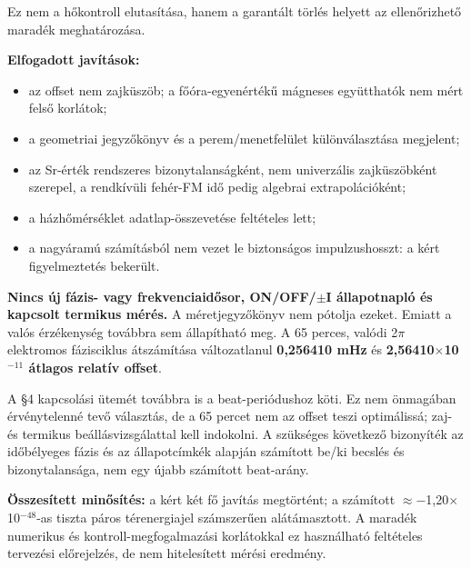 \documentclass[10pt,a4paper]{article}
\begin{document}
{\begin{quote}
\end{quote}
\par
Ez nem a hőkontroll elutasítása, hanem a garantált törlés helyett az ellenőrizhető maradék meghatározása.
\par
\vspace{2pt}\par\vspace{0.5pt}
\par
\textbf{Elfogadott javítások:}
\par
\begin{itemize}\setlength{\itemsep}{0.5pt}\setlength{\parskip}{0pt}\setlength{\topsep}{1pt}
\item az offset nem zajküszöb; a főóra-egyenértékű mágneses együtthatók nem mért felső korlátok;
\item a geometriai jegyzőkönyv és a perem/menetfelület különválasztása megjelent;
\item az Sr-érték rendszeres bizonytalanságként, nem univerzális zajküszöbként szerepel, a rendkívüli fehér-FM idő pedig algebrai extrapolációként;
\item a házhőmérséklet adatlap-összevetése feltételes lett;
\item a nagyáramú számításból nem vezet le biztonságos impulzushosszt: a kért figyelmeztetés bekerült.
\end{itemize}
\par
\textbf{Nincs új fázis- vagy frekvenciaidősor, ON/OFF/$\pm$I állapotnapló és kapcsolt termikus mérés.} A méretjegyzőkönyv nem pótolja ezeket. Emiatt a valós érzékenység továbbra sem állapítható meg. A 65 perces, valódi 2$\pi$ elektromos fázisciklus átszámítása változatlanul \textbf{0,256410 mHz} és \textbf{2,56410$\times$10$^{-11}$ átlagos relatív offset}.
\par
A \S4 kapcsolási ütemét továbbra is a beat-periódushoz köti. Ez nem önmagában érvénytelenné tevő választás, de a 65 percet nem az offset teszi optimálissá; zaj- és termikus beállásvizsgálattal kell indokolni. A szükséges következő bizonyíték az időbélyeges fázis és az állapotcímkék alapján számított be/ki becslés és bizonytalansága, nem egy újabb számított beat-arány.
\par
\textbf{Összesített minősítés:} a kért két fő javítás megtörtént; a számított $\approx$$-$1,20$\times$10$^{-48}$-as tiszta páros térenergiajel számszerűen alátámasztott. A maradék numerikus és kontroll-megfogalmazási korlátokkal ez használható feltételes tervezési előrejelzés, de nem hitelesített mérési eredmény.
$$}
\end{document}
